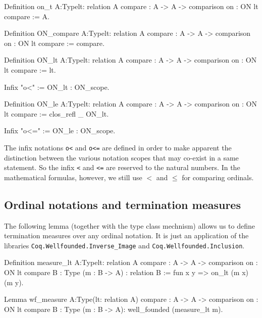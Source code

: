 \label{sect:on-lt-notation}
\label{sect:on-le-notation}
\begin{Coqsrc}
Definition on_t  {A:Type}{lt: relation A}
            {compare : A -> A -> comparison}
            {on : ON lt compare} := A.

Definition ON_compare {A:Type}{lt: relation A}
            {compare : A -> A -> comparison}
            {on : ON lt compare} := compare.

Definition ON_lt {A:Type}{lt: relation A}
           {compare : A -> A -> comparison}
           {on : ON lt compare} := lt.

Infix "o<" := ON_lt : ON_scope.

Definition ON_le  {A:Type}{lt: relation A}
           {compare : A -> A -> comparison}
           {on : ON lt compare} :=
  clos_refl _ ON_lt.

Infix "o<=" := ON_le : ON_scope.
\end{Coqsrc}


\begin{remark}
The infix notations \texttt{o<} and \texttt{o<=} are defined in order to make apparent the distinction between the various notation scopes that may co-exist in a same statement. So the infix \texttt{<} and \texttt{<=} are reserved to the natural numbers. In the mathematical formulas, however, we still use $<$ and $\leq$ for comparing ordinals.
\end{remark}


\subsection{Ordinal notations and  termination measures}
\label{sect:measure-ON}

The following lemma (together with the type class mechnism) allows us to define termination measures over any ordinal notation. It is just an application of  the libraries \texttt{Coq.Wellfounded.Inverse\_Image}
and  \texttt{Coq.Wellfounded.Inclusion}. 

\begin{Coqsrc}
Definition measure_lt {A:Type}{lt: relation A}
            {compare : A -> A -> comparison}
            {on : ON lt compare}
            {B : Type} (m : B -> A) : relation B :=
             fun x y => on_lt (m x) (m y).
            
Lemma wf_measure  {A:Type}(lt: relation A)
            {compare : A -> A -> comparison}
            {on : ON lt compare}
            {B : Type}
            (m : B -> A):  well_founded (measure_lt m). 
\end{Coqsrc}

